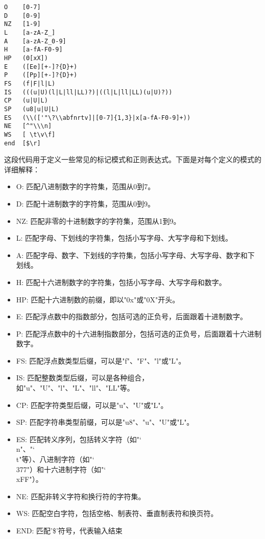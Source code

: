 \documentclass[lang=cn,11pt,a4paper]{elegantpaper}
\begin{document}
\begin{lstlisting}[language=text]
O    [0-7]  
D    [0-9] 
NZ   [1-9] 
L    [a-zA-Z_] 
A    [a-zA-Z_0-9] 
H    [a-fA-F0-9] 
HP   (0[xX]) 
E    ([Ee][+-]?{D}+) 
P    ([Pp][+-]?{D}+) 
FS   (f|F|l|L) 
IS   (((u|U)(l|L|ll|LL)?)|((l|L|ll|LL)(u|U)?)) 
CP   (u|U|L) 
SP   (u8|u|U|L) 
ES   (\\(['"\?\\abfnrtv]|[0-7]{1,3}|x[a-fA-F0-9]+)) 
NE   [^"\\\n] 
WS   [ \t\v\f] 
end  [$\r]

\end{lstlisting}

这段代码用于定义一些常见的标记模式和正则表达式。下面是对每个定义的模式的详细解释：

\begin{itemize}
    \item O: 匹配八进制数字的字符集，范围从0到7。
    \item D: 匹配十进制数字的字符集，范围从0到9。
    \item NZ: 匹配非零的十进制数字的字符集，范围从1到9。
    \item L: 匹配字母、下划线的字符集，包括小写字母、大写字母和下划线。
    \item A: 匹配字母、数字、下划线的字符集，包括小写字母、大写字母、数字和下划线。
    \item H: 匹配十六进制数字的字符集，包括小写字母、大写字母和数字。
    \item HP: 匹配十六进制数的前缀，即以"0x"或"0X"开头。
    \item E: 匹配浮点数中的指数部分，包括可选的正负号，后面跟着十进制数字。
    \item P: 匹配浮点数中的十六进制指数部分，包括可选的正负号，后面跟着十六进制数字。
    \item FS: 匹配浮点数类型后缀，可以是"f"、"F"、"l"或"L"。
    \item IS: 匹配整数类型后缀，可以是各种组合，如"u"、"U"、"l"、"L"、"ll"、"LL"等。
    \item CP: 匹配字符类型后缀，可以是"u"、"U"或"L"。
    \item SP: 匹配字符串类型前缀，可以是"u8"、"u"、"U"或"L"。
    \item ES: 匹配转义序列，包括转义字符（如"\char`\\n"、"\char`\\t"等）、八进制字符（如"\char`\\377"）和十六进制字符（如"\char`\\xFF"）。
    \item NE: 匹配非转义字符和换行符的字符集。
    \item WS: 匹配空白字符，包括空格、制表符、垂直制表符和换页符。
    \item END: 匹配'\$'符号，代表输入结束
\end{itemize}
\end{document}
